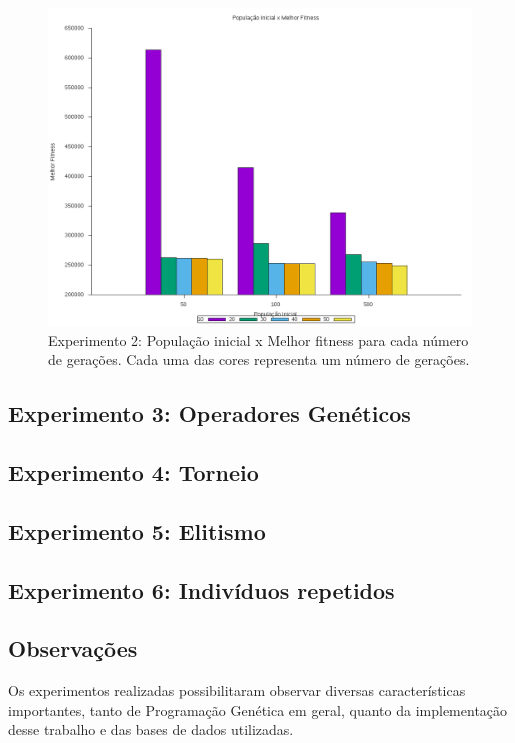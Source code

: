 \documentclass[12pt]{article}
\begin{document}
\begin{figure}[ht]
  \centering
  \includegraphics[width=1\textwidth]{exp2h.png}
  \caption{Experimento 2: População inicial x Melhor fitness para cada número de gerações.
  Cada uma das cores representa um número de gerações.}
  \label{fig:exp2h}
\end{figure}

\subsection{Experimento 3: Operadores Genéticos}

\subsection{Experimento 4: Torneio}

\subsection{Experimento 5: Elitismo}

\subsection{Experimento 6: Indivíduos repetidos}

\subsection{Observações}

Os experimentos realizadas possibilitaram observar diversas características importantes, tanto
de Programação Genética em geral, quanto da implementação desse trabalho e das bases de dados
utilizadas.
\end{document}
